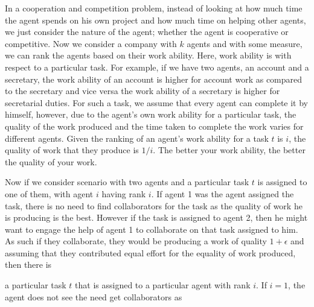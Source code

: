 \documentclass[a4paper,10pt]{article}
\theoremstyle{definition}
\begin{document}
In a cooperation and competition problem, instead of looking at how much time the agent spends on his own project and how much time on helping other agents, we just consider the nature of the agent; whether the agent is cooperative or competitive. Now we consider a company with $k$ agents and with some measure, we can rank the agents based on their work ability. Here, work ability is with respect to a particular task. For example, if we have two agents, an account and a secretary, the work ability of an account is higher for account work as compared to the secretary and vice versa the work ability of a secretary is higher for secretarial duties. For such a task, we assume that every agent can complete it by himself, however, due to the agent's own work ability for a particular task, the quality of the work produced and the time taken to complete the work varies for different agents. Given the ranking of an agent's work ability for a task $t$ is $i$, the quality of work that they produce is $1/i$. The better your work ability, the better the quality of your work.

Now if we consider scenario with two agents and a particular task $t$ is assigned to one of them, with agent $i$ having rank $i$. If agent 1 was the agent assigned the task, there is no need to find collaborators for the task as the quality of work he is producing is the best. However if the task is assigned to agent 2, then he might want to engage the help of agent 1 to collaborate on that task assigned to him. As such if they collaborate, they would be producing a work of quality $1+\epsilon$ and assuming that they contributed equal effort for the equality of work produced, then there is 


a particular task $t$ that is assigned to a particular agent with rank $i$. If $i=1$, the agent does not see the need get collaborators as 
\end{document}
